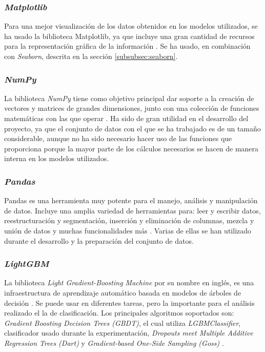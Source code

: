 \subsubsection{\textit{Matplotlib}}
\label{subsubsec:matplotlib}

Para una mejor visualización de los datos obtenidos en los modelos utilizados, se ha usado la biblioteca Matplotlib, ya que incluye una gran cantidad de recursos para la representación gráfica de la información \cite{matplotlib}. Se ha usado, en combinación con \textit{Seaborn}, descrita en la sección \ref{subsubsec:seaborn}.

\subsubsection{\textit{NumPy}}
\label{subsubsec:numpy}

La biblioteca \textit{NumPy} tiene como objetivo principal dar soporte a la creación de vectores y matrices de grandes dimensiones, junto con una colección de funciones matemáticas con las que operar \cite{numpy}. Ha sido de gran utilidad en el desarrollo del proyecto, ya que el conjunto de datos con el que se ha trabajado es de un tamaño considerable, aunque no ha sido necesario hacer uso de las funciones que proporciona porque la mayor parte de los cálculos necesarios se hacen de manera interna en los modelos utilizados.

\subsubsection{\textit{Pandas}}
\label{subsubsec:pandas}

Pandas es una herramienta muy potente para el manejo, análisis y manipulación de datos. Incluye una amplia variedad de herramientas para: leer y escribir datos, reestructuración y segmentación, inserción y eliminación de columnas, mezcla y unión de datos y muchas funcionalidades más \cite{pandas}. Varias de ellas se han utilizado durante el desarrollo y la preparación del conjunto de datos.

\subsubsection{\textit{LightGBM}}
\label{subsubsec:lightgbm}

La biblioteca \textit{Light Gradient-Boosting Machine} por su nombre en inglés, es una infraestructura de aprendizaje automático basada en modelos de árboles de decisión \cite{lgbm}. Se puede usar en diferentes tareas, pero la importante para el análisis realizado el la de clasificación. Los principales algoritmos soportados son: \textit{Gradient Boosting Decision Trees (GBDT)}, el cual utiliza \textit{LGBMClassifier}, clasificador usado durante la experimentación, \textit{Dropouts meet Multiple Additive Regression Trees (Dart)} y \textit{Gradient-based One-Side Sampling (Goss)} \cite{lgbm_alg}.

